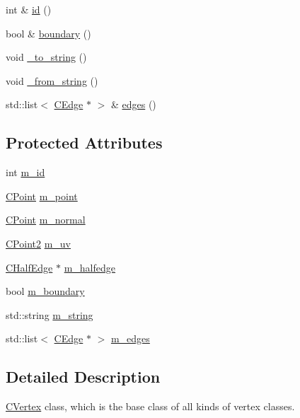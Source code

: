 \begin{DoxyCompactItemize}
int \& \hyperlink{class_mesh_lib_1_1_c_vertex_a90179a85f86617e62fa57d0157e38c77}{id} ()
\item 
bool \& \hyperlink{class_mesh_lib_1_1_c_vertex_a1bfd813474ce6f0347c442412c3bb650}{boundary} ()
\item 
void \hyperlink{class_mesh_lib_1_1_c_vertex_a16b808933a970ac84776d404d21ecaee}{\+\_\+to\+\_\+string} ()
\item 
void \hyperlink{class_mesh_lib_1_1_c_vertex_a89670e5392950fcbeb467fa5f7a8c88a}{\+\_\+from\+\_\+string} ()
\item 
std\+::list$<$ \hyperlink{class_mesh_lib_1_1_c_edge}{C\+Edge} $\ast$ $>$ \& \hyperlink{class_mesh_lib_1_1_c_vertex_a03ec8f7820f2f3f6cd0a97f1958197c8}{edges} ()
\end{DoxyCompactItemize}
\subsection*{Protected Attributes}
\begin{DoxyCompactItemize}
\item 
int \hyperlink{class_mesh_lib_1_1_c_vertex_a686d33c96343be3d7b9c46b628061bd9}{m\+\_\+id}
\item 
\hyperlink{class_mesh_lib_1_1_c_point}{C\+Point} \hyperlink{class_mesh_lib_1_1_c_vertex_a0611ed63a1451d3077bcb2dbaf5f1e89}{m\+\_\+point}
\item 
\hyperlink{class_mesh_lib_1_1_c_point}{C\+Point} \hyperlink{class_mesh_lib_1_1_c_vertex_aa313fb31475b4951f50e50f141cec0fc}{m\+\_\+normal}
\item 
\hyperlink{class_mesh_lib_1_1_c_point2}{C\+Point2} \hyperlink{class_mesh_lib_1_1_c_vertex_a8509cd466e9db87b76b2571783d111a2}{m\+\_\+uv}
\item 
\hyperlink{class_mesh_lib_1_1_c_half_edge}{C\+Half\+Edge} $\ast$ \hyperlink{class_mesh_lib_1_1_c_vertex_a322a95750dc442c4559ef180d35a6074}{m\+\_\+halfedge}
\item 
bool \hyperlink{class_mesh_lib_1_1_c_vertex_a82467ff3e1f8bf16972a1b63326441c3}{m\+\_\+boundary}
\item 
std\+::string \hyperlink{class_mesh_lib_1_1_c_vertex_a0ad694c0749eb9b71c0faaafde732d3e}{m\+\_\+string}
\item 
std\+::list$<$ \hyperlink{class_mesh_lib_1_1_c_edge}{C\+Edge} $\ast$ $>$ \hyperlink{class_mesh_lib_1_1_c_vertex_ac6914ef1d52a245340b8bd07e671c87d}{m\+\_\+edges}
\end{DoxyCompactItemize}


\subsection{Detailed Description}
\hyperlink{class_mesh_lib_1_1_c_vertex}{C\+Vertex} class, which is the base class of all kinds of vertex classes. 

